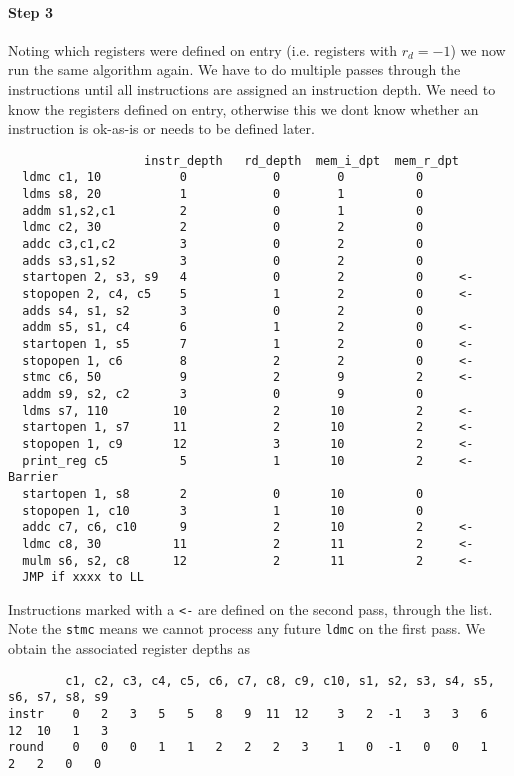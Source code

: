 \paragraph{Step 3}
Noting which registers were defined on entry (i.e. registers
with $r_d=-1$) we now run the same algorithm again.
We have to do multiple passes through the instructions until all
instructions are assigned an instruction depth. We need
to know the registers defined on entry, otherwise this
we dont know whether an instruction is ok-as-is or needs
to be defined later.
\begin{verbatim}
                   instr_depth   rd_depth  mem_i_dpt  mem_r_dpt
  ldmc c1, 10           0            0        0          0
  ldms s8, 20           1            0        1          0
  addm s1,s2,c1         2            0        1          0
  ldmc c2, 30           2            0        2          0
  addc c3,c1,c2         3            0        2          0
  adds s3,s1,s2         3            0        2          0
  startopen 2, s3, s9   4            0        2          0     <-
  stopopen 2, c4, c5    5            1        2          0     <-
  adds s4, s1, s2       3            0        2          0
  addm s5, s1, c4       6            1        2          0     <-
  startopen 1, s5       7            1        2          0     <-
  stopopen 1, c6        8            2        2          0     <-
  stmc c6, 50           9            2        9          2     <-
  addm s9, s2, c2       3            0        9          0
  ldms s7, 110         10            2       10          2     <-
  startopen 1, s7      11            2       10          2     <-
  stopopen 1, c9       12            3       10          2     <-
  print_reg c5          5            1       10          2     <- Barrier
  startopen 1, s8       2            0       10          0
  stopopen 1, c10       3            1       10          0
  addc c7, c6, c10      9            2       10          2     <-
  ldmc c8, 30          11            2       11          2     <-
  mulm s6, s2, c8      12            2       11          2     <-
  JMP if xxxx to LL
\end{verbatim}
Instructions marked with a \verb+<-+ are defined on the second pass,
through the list. Note the \verb+stmc+ means we cannot process any future
\verb+ldmc+ on the first pass.
We obtain the associated register depths as
\begin{verbatim}
        c1, c2, c3, c4, c5, c6, c7, c8, c9, c10, s1, s2, s3, s4, s5, s6, s7, s8, s9
instr    0   2   3   5   5   8   9  11  12    3   2  -1   3   3   6  12  10   1   3
round    0   0   0   1   1   2   2   2   3    1   0  -1   0   0   1   2   2   0   0
\end{verbatim}


